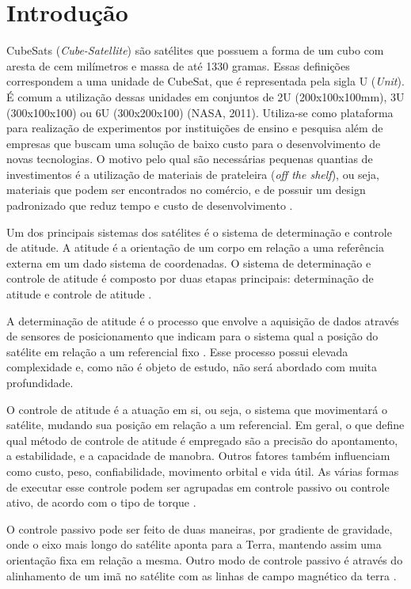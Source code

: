\documentclass[
	12pt,				%
	openany,			%
	twoside,			%
	a4paper,			%
	english,			%
	french,				%
	spanish,			%
	brazil,				%
	oldfontcommands
	]{abntex2}
\begin{document}
\chapter[Introdução]{Introdução}

CubeSats (\textit{Cube-Satellite}) são satélites que possuem a forma de um cubo com aresta de cem milímetros e massa de até 1330 gramas. Essas definições correspondem a uma unidade de CubeSat, que é representada pela sigla U (\textit{Unit}). É comum a utilização dessas unidades em conjuntos de 2U (200x100x100mm), 3U (300x100x100) ou 6U (300x200x100) (NASA, 2011). Utiliza-se como plataforma para realização de experimentos por instituições de ensino e pesquisa além de empresas que buscam uma solução de baixo custo para o desenvolvimento de novas tecnologias. O motivo pelo qual são necessárias pequenas quantias de investimentos é a utilização de materiais de prateleira (\textit{off the shelf}), ou seja, materiais que podem ser encontrados no comércio, e de possuir um design padronizado que reduz tempo e custo de desenvolvimento \cite{CalPoly}.

Um dos principais sistemas dos satélites é o sistema de determinação e controle de atitude. A atitude é a orientação de um corpo em relação a uma referência externa em um dado sistema de coordenadas. O sistema de determinação e controle de atitude é composto por duas etapas principais: determinação de atitude e controle de atitude \cite{FrancLav}.

A determinação de atitude é o processo que envolve a aquisição de dados através de sensores de posicionamento que indicam para o sistema qual a posição do satélite em relação a um referencial fixo \cite{FrancLav}. Esse processo possui elevada complexidade e, como não é objeto de estudo, não será abordado com muita profundidade.

O controle de atitude é a atuação em si, ou seja, o sistema que movimentará o satélite, mudando sua posição em relação a um referencial. Em geral, o que define qual método de controle de atitude é empregado são a precisão do apontamento, a estabilidade, e a capacidade de manobra. Outros fatores também influenciam como custo, peso, confiabilidade, movimento orbital e vida útil. As várias formas de executar esse controle podem ser agrupadas em controle passivo ou controle ativo, de acordo com o tipo de torque \cite{FrancLav}.

O controle passivo pode ser feito de duas maneiras, por gradiente de gravidade, onde o eixo mais longo do satélite aponta para a Terra, mantendo assim uma orientação fixa em relação a mesma. Outro modo de controle passivo é através do alinhamento de um imã no satélite com as linhas de campo magnético da terra \cite{FrancLav}.
\end{document}
